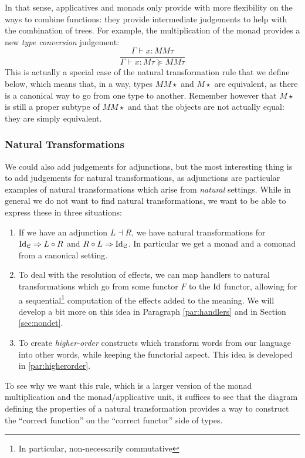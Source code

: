 \medskip

In that sense, applicatives and monads only provide with more flexibility on
the ways to combine functions:
they provide intermediate judgements to help with the combination of trees.
For example, the multiplication of the monad provides a new
\emph{type conversion} judgement:
\begin{equation*}
	\frac{\Gamma\vdash x: MM\tau}{\Gamma\vdash x: M\tau \succeq MM\tau}
\end{equation*}
This is actually a special case of the natural transformation rule that we
define below, which means that, in a way, types $MM\star$ and $M\star$ are
equivalent, as there is a canonical way to go from one type to another.
Remember however that $M\star$ is still a proper subtype of $MM\star$ and that
the objects are not actually equal: they are simply equivalent.

\subsubsection{Natural Transformations}
\label{subsubsec:transnat}
We could also add judgements for adjunctions, but the most interesting thing is
to add judgements for natural transformations, as adjunctions are particular
examples of natural transformations which arise from \emph{natural} settings.
While in general we do not want to find natural transformations, we want to be
able to express these in three situations:
\begin{enumerate}
	\item If we have an adjunction $L\dashv R$, we have natural transformations
	      for $\mathrm{Id}_{\mathcal{C}} \Rightarrow L \circ R$ and $R\circ L \Rightarrow \mathrm{Id}_{\mathcal{C}}$.
	      In particular we get a monad and a comonad from a canonical setting.
	\item To deal with the resolution of effects, we can map handlers to natural
	      transformations which go from some functor $F$ to the $\mathrm{Id}$ functor,
	      allowing for a sequential\footnote{In particular, non-necessarily
		      commutative} computation of the effects added to the meaning.
	      We will develop a bit more on this idea in Paragraph \ref{par:handlers}
	      and in Section \ref{sec:nondet}.
	\item To create \emph{higher-order} constructs which transform words from our
	      language into other words, while keeping the functorial aspect.
	      This idea is developed in \ref{par:higherorder}.
\end{enumerate}
To see why we want this rule, which is a larger version of the monad
multiplication and the monad/applicative unit, it suffices to see that the
diagram defining the properties of a natural transformation provides a way
to construct the ``correct function'' on the ``correct functor'' side of types.

